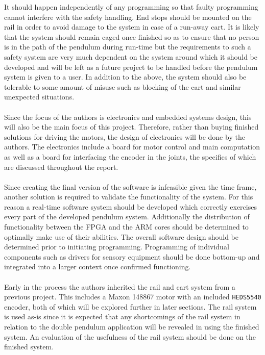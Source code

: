 It should happen independently of any programming so that faulty programming cannot interfere with the safety handling.
End stops should be mounted on the rail in order to avoid damage to the system in case of a run-away cart.
It is likely that the system should remain caged once finished so as to ensure that no person is in the path of the pendulum during run-time but the requirements to such a safety system are very much dependent on the system around which it should be developed and will be left as a future project to be handled before the pendulum system is given to a user.
In addition to the above, the system should also be tolerable to some amount of misuse such as blocking of the cart and similar unexpected situations.
\\~\\
Since the focus of the authors is electronics and embedded systems design, this will also be the main focus of this project.
Therefore, rather than buying finished solutions for driving the motors, the design of electronics will be done by the authors. 
The electronics include a board for motor control and main computation as well as a board for interfacing the encoder in the joints, the specifics of which are discussed throughout the report.
\\~\\
Since creating the final version of the software is infeasible given the time frame, another solution is required to validate the functionality of the system.
For this reason a real-time software system should be developed which correctly exercises every part of the developed pendulum system.
Additionally the distribution of functionality between the FPGA and the ARM cores should be determined to optimally make use of their abilities.
The overall software design should be determined prior to initiating programming.
Programming of individual components such as drivers for sensory equipment should be done bottom-up and integrated into a larger context once confirmed functioning.
\\~\\
Early in the process the authors inherited the rail and cart system from a previous project.
This includes a Maxon 148867 motor with an included \texttt{HEDS5540} encoder, both of which will be explored further in later sections.
The rail system is used as-is since it is expected that any shortcomings of the rail system in relation to the double pendulum application will be revealed in using the finished system.
An evaluation of the usefulness of the rail system should be done on the finished system.

